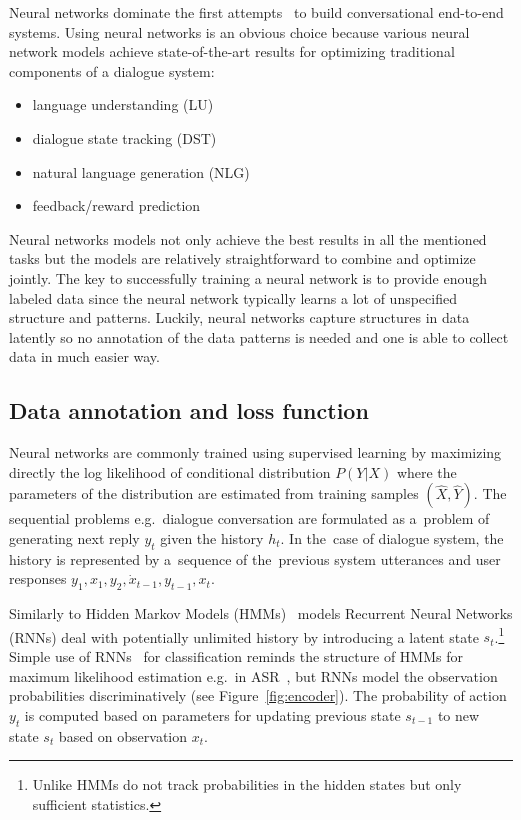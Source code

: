 \documentclass[11pt]{article}
\begin{document}
Neural networks dominate the first attempts~\cite{williams2016end,bordes_learning_2016,weston2015endtoend_prereq} to build conversational end-to-end systems.
Using neural networks is an obvious choice because various neural network models achieve state-of-the-art results for optimizing traditional components of a dialogue system:
\begin{itemize}
    \item language understanding (LU)~\cite{mairesse_spoken_2009} 
    \item dialogue state tracking (DST)~\cite{williams_web-style_2014,henderson2014word,vodolan_hybrid_2015,platek_recurrent_2016}
    \item natural language generation (NLG)~\cite{dusek_sequence2sequence_2016,wen_networkbased_2016}
    \item feedback/reward prediction~\cite{su_learning_2015}
\end{itemize}
Neural networks models not only achieve the best results in all the mentioned tasks but the models are relatively straightforward to combine and optimize jointly.
The key to successfully training a neural network is to provide enough labeled data since the neural network typically learns a lot of unspecified structure and patterns.
Luckily, neural networks capture structures in data latently so no annotation of the data patterns is needed and one is able to collect data in much easier way.

\subsection{Data annotation and loss function}
\label{sub:data_annotation}

Neural networks are commonly trained using supervised learning by maximizing directly the log likelihood of conditional distribution $ P(Y| X) $ where the parameters of the distribution are estimated from training samples $ (\hat{X}, \hat{Y}) $.
The sequential problems e.g.\ dialogue conversation are formulated as a~problem of generating next reply $y_t$ given the history $h_t$.
In the~case of dialogue system, the history is represented by a~sequence of the~previous system utterances and user responses $ y_1, x_1, y_2, \dot x_{t-1}, y_{t-1}, x_t $.

Similarly to Hidden Markov Models (HMMs)~\cite{huang_hidden_1990} models Recurrent Neural Networks (RNNs) deal with potentially unlimited history by introducing a latent state $s_t$.\footnote{Unlike HMMs do not track probabilities in the hidden states but only sufficient statistics.}
Simple use of  RNNs~\cite{gers_learning_2000} for classification reminds the structure of HMMs for maximum likelihood estimation e.g.\ in ASR~\cite{huang_hidden_1990}, but RNNs model the observation probabilities discriminatively (see Figure~\ref{fig:encoder}).
The probability of action $ y_t $ is computed based on parameters for updating previous state $s_{t-1}$ to new state $s_t$ based on observation $x_t$.
\end{document}
